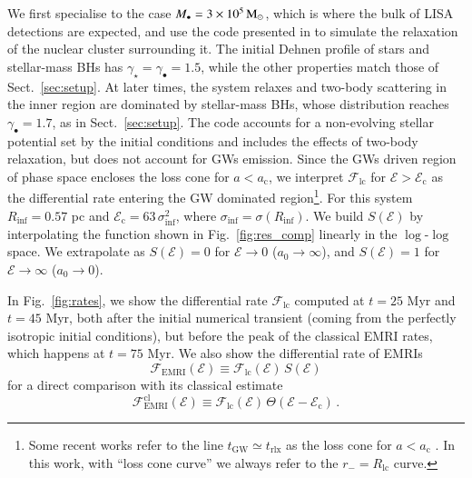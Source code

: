 \documentclass[desactivate]{aa}
\begin{document}
    We first specialise to the case $M_\bullet = 3\times10^5\, {\rm M}_\odot$, which is where the bulk of LISA detections are expected, and use the code presented in \citet{2022MNRAS.514.3270B} to simulate the relaxation of the nuclear cluster surrounding it. The initial Dehnen profile of stars and stellar-mass BHs has $\gamma_\star=\gamma_\bullet=1.5$, while the other properties match those of Sect.~\ref{sec:setup}. At later times, the system relaxes and two-body scattering in the inner region are dominated by stellar-mass BHs, whose distribution reaches $\gamma_\bullet=1.7$, as in Sect.~\ref{sec:setup}. The code accounts for a non-evolving stellar potential set by the initial conditions and includes the effects of two-body relaxation, but does not account for GWs emission. Since the GWs driven region of phase space encloses the loss cone for $a < a_\mathrm{c}$, we interpret $\mathcal{F}_\mathrm{lc}$ for $\mathcal{E}>\mathcal{E}_\mathrm{c}$ as the differential rate entering the GW dominated region\footnote{Some recent works refer to the line $t_\mathrm{GW}\simeq t_\mathrm{rlx}$ as the loss cone for $a < a_\mathrm{c}$ \citep{2024PhRvD.109d3005B, 2024arXiv240607627K, 2024arXiv240619443R}. In this work, with ``loss cone curve'' we always refer to the $r_- = R_\mathrm{lc}$ curve.}.
    For this system $R_\mathrm{inf} = 0.57$ pc and $\mathcal{E}_\mathrm{c} = 63 \, \sigma^2_\mathrm{inf}$, where $\sigma_\mathrm{inf} = \sigma (R_\mathrm{inf})$. We build $S(\mathcal{E})$ by interpolating the function shown in Fig.~\ref{fig:res_comp} linearly in the $\log$-$\log$ space. We extrapolate as $S(\mathcal{E}) = 0$ for $\mathcal{E}\to0$ ($a_0 \to \infty$), and $S(\mathcal{E}) = 1$ for $\mathcal{E}\to\infty$ ($a_0 \to 0$).
    
    In Fig.~\ref{fig:rates}, we show the differential rate $\mathcal{F}_\mathrm{lc}$ computed at $t=25$ Myr and $t=45$ Myr, both after the initial numerical transient (coming from the perfectly isotropic initial conditions), but before the peak of the classical EMRI rates, which happens at $t=75$ Myr. We also show the differential rate of EMRIs
    \begin{equation}
        \mathcal{F}_\mathrm{EMRI}(\mathcal{E}) \equiv \mathcal{F}_\mathrm{lc}(\mathcal{E}) \, S(\mathcal{E})
    \end{equation}
    for a direct comparison with its classical estimate
    \begin{equation}
        \mathcal{F}^\mathrm{cl}_\mathrm{EMRI}(\mathcal{E}) \equiv \mathcal{F}_\mathrm{lc}(\mathcal{E}) \, \Theta(\mathcal{E}-\mathcal{E}_\mathrm{c})\,.
    \end{equation}
    
\end{document}

